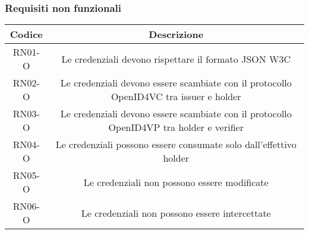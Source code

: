 \clearpage
\subsubsection*{Requisiti non funzionali}
    \begin{longtable}{|c|c|}
        \hline
        \textbf{Codice} & \textbf{Descrizione} \\
        \hline
        RN01-O & Le credenziali devono rispettare il formato JSON W3C\\
        RN02-O & Le credenziali devono essere scambiate con il protocollo OpenID4VC tra issuer e holder\\
        RN03-O & Le credenziali devono essere scambiate con il protocollo OpenID4VP tra holder e verifier\\
        RN04-O & Le credenziali possono essere consumate solo dall'effettivo holder\\
        RN05-O & Le credenziali non possono essere modificate\\
        RN06-O & Le credenziali non possono essere intercettate\\
        \hline
    \end{longtable}